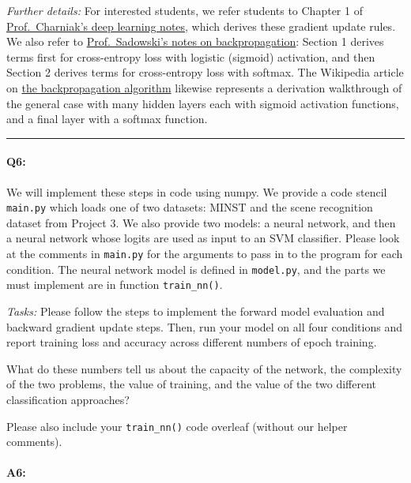 \emph{Further details:} For interested students, we refer students to Chapter 1 of \href{https://cs.brown.edu/courses/csci1460/assets/files/deep-learning.pdf}{Prof.~Charniak's deep learning notes}, which derives these gradient update rules. We also refer to \href{https://www.ics.uci.edu/~pjsadows/notes.pdf}{Prof.~Sadowski's notes on backpropagation}: Section 1 derives terms first for cross-entropy loss with logistic (sigmoid) activation, and then Section 2 derives terms for cross-entropy loss with softmax. The Wikipedia article on \href{https://en.wikipedia.org/wiki/Backpropagation}{the backpropagation algorithm} likewise represents a derivation walkthrough of the general case with many hidden layers each with sigmoid activation functions, and a final layer with a softmax function.

\hspace{\fill}\rule{0.5\linewidth}{.5pt}\hspace{\fill}


\paragraph{Q6:} We will implement these steps in code using numpy. We provide a code stencil \texttt{main.py} which loads one of two datasets: MINST and the scene recognition dataset from Project 3. We also provide two models: a neural network, and then a neural network whose logits are used as input to an SVM classifier. Please look at the comments in \texttt{main.py} for the arguments to pass in to the program for each condition. The neural network model is defined in \texttt{model.py}, and the parts we must implement are in function \texttt{train\_nn()}. 

\emph{Tasks:} Please follow the steps to implement the forward model evaluation and backward gradient update steps. Then, run your model on all four conditions and report training loss and accuracy across different numbers of epoch training. 

What do these numbers tell us about the capacity of the network, the complexity of the two problems, the value of training, and the value of the two different classification approaches?

Please also include your \texttt{train\_nn()} code overleaf (without our helper comments).
\paragraph{A6:}

